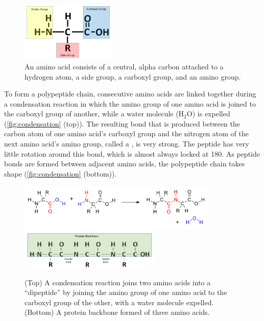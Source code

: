 \begin{figure}[h]
	\centering
	\mySfFamily
	\includegraphics[width = 0.4\textwidth]{../images/AminoAcid.png}
	\caption{An amino acid consists of a central, alpha carbon attached to a hydrogen atom, a side group, a carboxyl group, and an amino group.}
	\label{fig:AminoAcid}
\end{figure}

To form a polypeptide chain, consecutive amino acids are linked together during a condensation reaction in which the amino group of one amino acid is joined to the carboxyl group of another, while a water molecule ($\text{H}_2\text{O}$) is expelled (\autoref{fig:condensation} (top)). The resulting bond that is produced between the carbon atom of one amino acid's carboxyl group and the nitrogen atom of the next amino acid's amino group, called a , is very strong. The peptide has very little rotation around this bond, which is almost always locked at 180\textdegree. As peptide bonds are formed between adjacent amino acids, the polypeptide chain takes shape (\autoref{fig:condensation} (bottom)).

\begin{figure}[h]
	\centering
	\mySfFamily
	\includegraphics[width = 0.85\textwidth]{../images/dipeptide_reaction.png}\\[0.5ex]
	\includegraphics[width = 0.6\textwidth]{../images/Backbone.png}
	\caption{(Top) A condensation reaction joins two amino acids into a ``dipeptide'' by joining the amino group of one amino acid to the carboxyl group of the other, with a water molecule expelled. (Bottom) A protein backbone formed of three amino acids.}
	\label{fig:condensation}
\end{figure}

